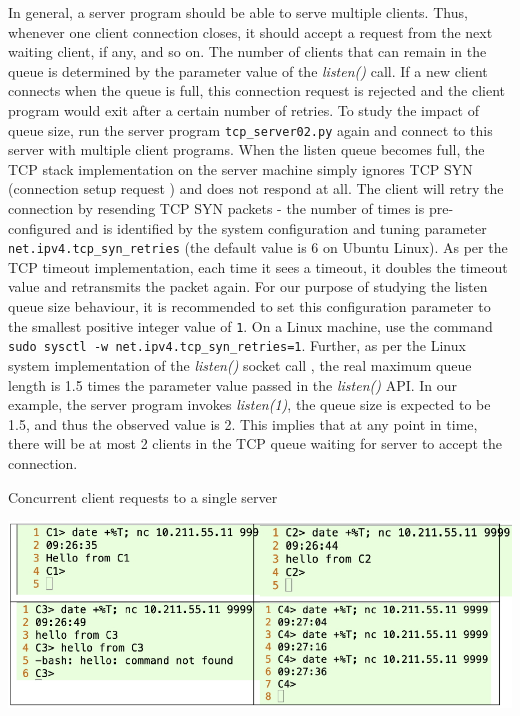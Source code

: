 \begin{multicols}{2}
In general, a server program should be able to serve multiple clients. Thus, whenever one client connection closes, it should accept a request from the next waiting client, if any, and so on. The number of clients that can remain in the queue is determined by the parameter value of the \textit{listen()} call. If a new client connects when the queue is full, this connection request is rejected and the client program would exit after a certain number of retries. To study the impact of queue size, run the server program \texttt{tcp\_server02.py} \cite{art1-key17} again and connect to this server with multiple client programs. When the listen queue becomes full, the TCP stack implementation on the server machine simply ignores TCP SYN (connection setup request \cite{art1-key09}\cite{art1-key11}) and does not respond at all. The client will retry the connection by resending TCP SYN packets - the number of times is pre-configured and is identified by the system configuration and tuning parameter \texttt{net.ipv4.tcp\_syn\_retries} (the default value is 6 on Ubuntu Linux). As per the TCP timeout implementation, each time it sees a timeout, it doubles the timeout value \cite{art1-key09} and retransmits the packet again. For our purpose of studying the listen queue size behaviour, it is recommended to set this configuration parameter to the smallest positive integer value of \texttt{1}. On a Linux machine, use the command \texttt{sudo sysctl -w net.ipv4.tcp\_syn\_retries=1}. Further, as per the Linux system implementation of the \textit{listen()} socket call \cite{art1-key18}, the real maximum queue length is 1.5 times the parameter value passed in the \textit{listen()} API. In our example, the server program invokes \textit{listen(1)}, the queue size is expected to be 1.5, and thus the observed value is 2. This implies that at any point in time, there will be at most 2 clients in the TCP queue waiting for server to accept the connection.
\end{multicols}

\begin{table}[H]

\vspace{-.9cm}

\centering
\caption{Concurrent client requests to a single server}\label{tab04}
\includegraphics[scale=2.28]{src/Figures/chap1/tab04.jpg}
\end{table}

